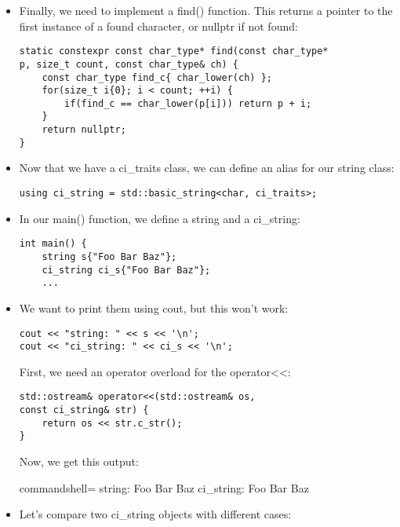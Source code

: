 \begin{itemize}
\item 
Finally, we need to implement a find() function. This returns a pointer to the first instance of a found character, or nullptr if not found:

\begin{lstlisting}[style=styleCXX]
static constexpr const char_type* find(const char_type*
p, size_t count, const char_type& ch) {
	const char_type find_c{ char_lower(ch) };
	for(size_t i{0}; i < count; ++i) {
		if(find_c == char_lower(p[i])) return p + i;
	}
	return nullptr;
}
\end{lstlisting}

\item 
Now that we have a ci\_traits class, we can define an alias for our string class:

\begin{lstlisting}[style=styleCXX]
using ci_string = std::basic_string<char, ci_traits>;
\end{lstlisting}

\item 
In our main() function, we define a string and a ci\_string:

\begin{lstlisting}[style=styleCXX]
int main() {
	string s{"Foo Bar Baz"};
	ci_string ci_s{"Foo Bar Baz"};
	...
\end{lstlisting}

\item 
We want to print them using cout, but this won't work:

\begin{lstlisting}[style=styleCXX]
cout << "string: " << s << '\n';
cout << "ci_string: " << ci_s << '\n';
\end{lstlisting}

First, we need an operator overload for the operator<{}<:

\begin{lstlisting}[style=styleCXX]
std::ostream& operator<<(std::ostream& os,
const ci_string& str) {
	return os << str.c_str();
}
\end{lstlisting}

Now, we get this output:

\begin{tcblisting}{commandshell={}}
string: Foo Bar Baz
ci_string: Foo Bar Baz
\end{tcblisting}

\item 
Let's compare two ci\_string objects with different cases:


\end{itemize}
